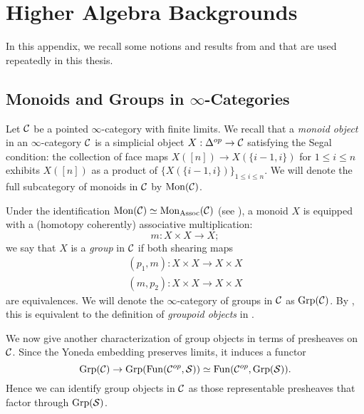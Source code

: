 \chapter{Higher Algebra Backgrounds}

In this appendix, we recall some notions and results from \cite{HTT} and \cite{HA} that are used repeatedly in this thesis.


\section{Monoids and Groups in $\infty$-Categories}
Let ${\mathcal{C}}$ be a pointed $\infty$-category with finite limits. 
We recall that a \emph{monoid object} in an $\infty$-category ${\mathcal{C}}$ \cite[
Definition 4.1.2.5.]{HA} is a simplicial object $X: \Delta^{op}\to {\mathcal{C}}$ satisfying the Segal condition:
the collection of face maps $X([n])\to X(\{i-1,i\})$ for $1\leq i \leq n$ exhibits $X([n])$ as a product of $\{X(\{i-1,i\})\}_{1\leq i \leq n}$. 
We will denote the full subcategory of monoids in ${\mathcal{C}}$ by $\operatorname{Mon}({\mathcal{C}})$.

Under the identification $\operatorname{Mon}({\mathcal{C}})\simeq \operatorname{Mon}_{\operatorname{Assoc}}({\mathcal{C}})$ (see \cite[Proposition 4.1.2.10.]{HA}), a monoid $X$ is equipped with a (homotopy coherently) associative multiplication:
$$
m: X\times X\to X;
$$
we say that $X$ is a \emph{group} in ${\mathcal{C}}$ \cite[Definition 5.2.6.2.]{HA} if both shearing maps
\begin{align*}
			(p_1, m):X\times X\to X\times X\\
	(m,p_2):X\times X\to X\times X
\end{align*}
are equivalences. 
We will denote the $\infty$-category of groups in ${\mathcal{C}}$ as $\operatorname{Grp}({\mathcal{C}})$.
By \cite[Remark 5.2.6.5.]{HA}, this is equivalent to the definition of \emph{groupoid objects} in \cite[Definition 6.1.2.7.]{HTT}.

We now give another characterization of group objects in terms of presheaves on ${\mathcal{C}}$.
Since the Yoneda embedding preserves limits, it induces a functor
$$
\operatorname{Grp}({\mathcal{C}}) \to  \operatorname{Grp}(\operatorname{Fun}({\mathcal{C}}^{op}, \operatorname{\mathcal{S}})) \simeq \operatorname{Fun}({\mathcal{C}}^{op}, \operatorname{Grp}(\operatorname{\mathcal{S}})).
$$
Hence we can identify group objects in ${\mathcal{C}}$ as those representable presheaves that factor through $\operatorname{Grp}(\operatorname{\mathcal{S}})$. 


